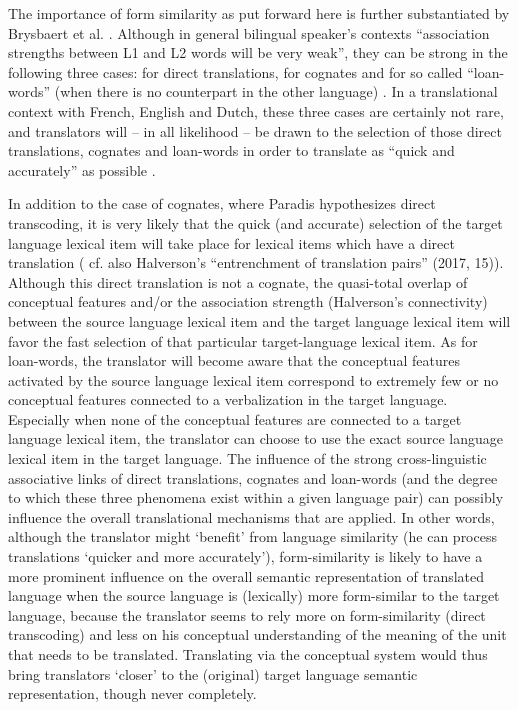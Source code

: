 The importance of form similarity as put forward here is further substantiated by Brysbaert et al. \citet[140]{heredia_bilingual_2014}. Although in general bilingual speaker’s contexts “association strengths between L1 and L2 words will be very weak”, they can be strong in the following three cases: for direct translations, for cognates and for so called “loan-words” (when there is no counterpart in the other language) \citep[141]{heredia_bilingual_2014}. In a translational context with French, English and Dutch, these three cases are certainly not rare, and translators will – in all likelihood – be drawn to the selection of those direct translations, cognates and loan-words in order to translate as “quick and accurately” as possible \citep{kroll_category_1994}.

In addition to the case of cognates, where Paradis hypothesizes direct transcoding, it is very likely that the quick (and accurate) selection of the target language lexical item will take place for lexical items which have a direct translation ( cf. also Halverson’s “entrenchment of translation pairs” (2017, 15)). Although this direct translation is not a cognate, the quasi-total overlap of conceptual features and/or the association strength (Halverson’s connectivity) between the source language lexical item and the target language lexical item will favor the fast selection of that particular target-language lexical item. As for loan-words, the translator will become aware that the conceptual features activated by the source language lexical item correspond to extremely few or no conceptual features connected to a verbalization in the target language. Especially when none of the conceptual features are connected to a target language lexical item, the translator can choose to use the exact source language lexical item in the target language. The influence of the strong cross-linguistic associative links of direct translations, cognates and loan-words (and the degree to which these three phenomena exist within a given language pair) can possibly influence the overall translational mechanisms that are applied. In other words, although the translator might ‘benefit’ from language similarity (he can process translations ‘quicker and more accurately’), form-similarity is likely to have a more prominent influence on the overall semantic representation of translated language when the source language is (lexically) more form-similar to the target language, because the translator seems to rely more on form-similarity (direct transcoding) and less on his conceptual understanding of the meaning of the unit that needs to be translated. Translating via the conceptual system would thus bring translators ‘closer’ to the (original) target language semantic representation, though never completely.

